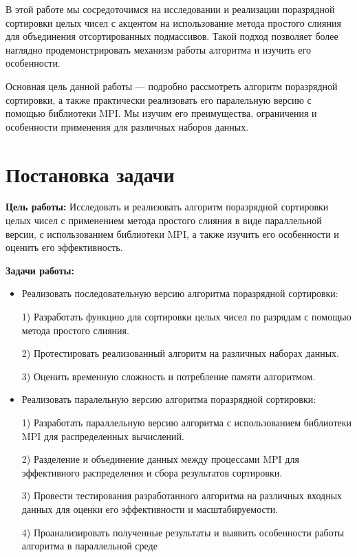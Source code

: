 \documentclass[a4paper, 14pt]{article}
\begin{document}
В этой работе мы сосредоточимся на исследовании и реализации поразрядной сортировки целых чисел с акцентом на использование метода простого слияния для объединения отсортированных подмассивов. Такой подход позволяет более наглядно продемонстрировать механизм работы алгоритма и изучить его особенности.

Основная цель данной работы — подробно рассмотреть алгоритм поразрядной сортировки, а также практически реализовать его паралельную версию с помощью библиотеки MPI. Мы изучим его преимущества, ограничения и особенности применения для различных наборов данных.
	
	
	\newpage
	\section*{\centering Постановка задачи}
	\textbf{Цель работы:} Исследовать и реализовать алгоритм поразрядной сортировки целых чисел с применением метода простого слияния в виде параллельной версии, с использованием библиотеки MPI, а также  изучить его особенности и оценить его эффективность.
	
	\textbf{Задачи работы:}
	\vspace{-1em}
	\begin{itemize}[leftmargin=3em]
		\setlength\itemsep{0cm}
		\item Реализовать последовательную версию алгоритма поразрядной сортировки:
        
        1) Разработать функцию для сортировки целых чисел по разрядам с помощью метода простого слияния. 
        
        2) Протестировать реализованный алгоритм на различных наборах данных. 
        
        3) Оценить временную сложность и потребление памяти алгоритмом.

        \item Реализовать паралельную версию алгоритма поразрядной сортировки:
        
		1) Разработать параллельную версию алгоритма с использованием библиотеки MPI для распределенных вычислений.
        
		2) Разделение и объединение данных между процессами MPI для эффективного распределения и сбора результатов сортировки.
        
        3) Провести тестирования разработанного алгоритма на различных входных данных для оценки его эффективности и масштабируемости.
        
		4) Проанализировать полученные результаты и выявить особенности работы алгоритма в параллельной среде
        
	\end{itemize}
	
\end{document}
